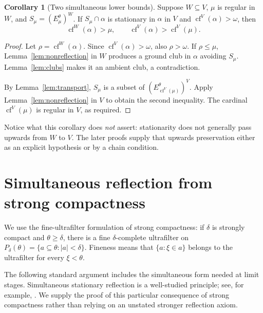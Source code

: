 \documentclass[11pt,letterpaper]{article}
\theoremstyle{definition}
\newtheorem{corollary}[definition]{Corollary}
\numberwithin{equation}{section}
\newcommand{\cf}{\operatorname{cf}}
\begin{document}
\begin{corollary}[Two simultaneous lower bounds]\label{cor:twobounds}
Suppose $W\subseteq V$, $\mu$ is regular in $W$, and
$S_\mu=(E^\theta_\mu)^W$. If $S_\mu\cap\alpha$ is stationary in $\alpha$ in $V$ and $\cf^V(\alpha)>\omega$, then
\[
\cf^W(\alpha)>\mu,
\qquad
\cf^V(\alpha)>\cf^V(\mu).
\]
\end{corollary}
\begin{proof}
Let $\rho=\cf^W(\alpha)$. Since $\cf^V(\alpha)>\omega$, also $\rho>\omega$. If $\rho\le\mu$, Lemma~\ref{lem:nonreflection} in $W$ produces a ground club in $\alpha$ avoiding $S_\mu$. Lemma~\ref{lem:clubs} makes it an ambient club, a contradiction.

By Lemma~\ref{lem:transport}, $S_\mu$ is a subset of
$(E^\theta_{\cf^V(\mu)})^V$. Apply Lemma~\ref{lem:nonreflection} in $V$ to obtain the second inequality. The cardinal $\cf^V(\mu)$ is regular in $V$, as required.
\end{proof}

Notice what this corollary does \emph{not} assert: stationarity does not generally pass upwards from $W$ to $V$. The later proofs supply that upwards preservation either as an explicit hypothesis or by a chain condition.

\section{Simultaneous reflection from strong compactness}\label{sec:reflection}

We use the fine-ultrafilter formulation of strong compactness: if $\delta$ is strongly compact and $\theta\ge\delta$, there is a fine $\delta$-complete ultrafilter on
$P_\delta(\theta)=\{a\subseteq\theta:|a|<\delta\}$. Fineness means that
$\{a:\xi\in a\}$ belongs to the ultrafilter for every $\xi<\theta$.

The following standard argument includes the simultaneous form needed at limit stages. Simultaneous stationary reflection is a well-studied principle; see, for example, \cite{hlh}. We supply the proof of this particular consequence of strong compactness rather than relying on an unstated stronger reflection axiom.
\end{document}
